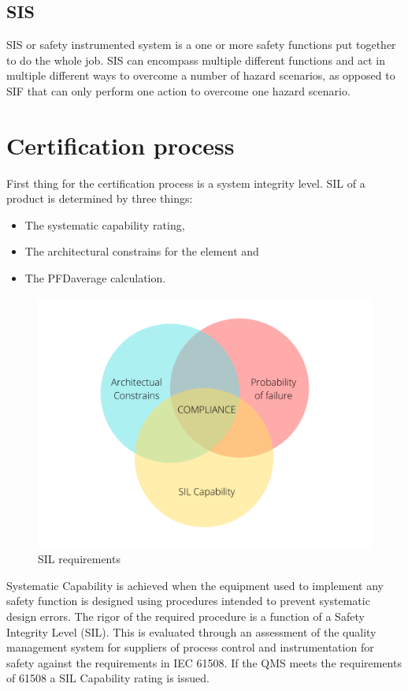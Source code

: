\subsection{SIS}
\label{sec:sis}

SIS or safety instrumented system is a one or more safety functions put together to do the whole job. SIS can encompass multiple different functions and act in multiple different ways to overcome a number of hazard scenarios, as opposed to SIF that can only perform one action to overcome one hazard scenario.

\section{Certification process}


First thing for the certification process is a system integrity level. SIL of a product is determined by three things:
\begin{itemize}

    \item The systematic capability rating,
    \item The architectural constrains for the element and
    \item The PFDaverage calculation.
    
\end{itemize}

\begin{figure}[H]

      \centering
      \includegraphics[width=0.7\linewidth]{images/sil_requirements.png}
      \caption{SIL requirements}
      \label{fig:sil_requirements}
    
\end{figure}

Systematic Capability is achieved when the equipment used to implement any safety function is designed using procedures intended to prevent systematic design errors.  The rigor of the required procedure is a function of a Safety Integrity Level (SIL). This is evaluated through an assessment of the quality management system for suppliers of process control and instrumentation for safety against the requirements in IEC 61508.  If the QMS meets the requirements of 61508 a SIL Capability rating is issued. 

